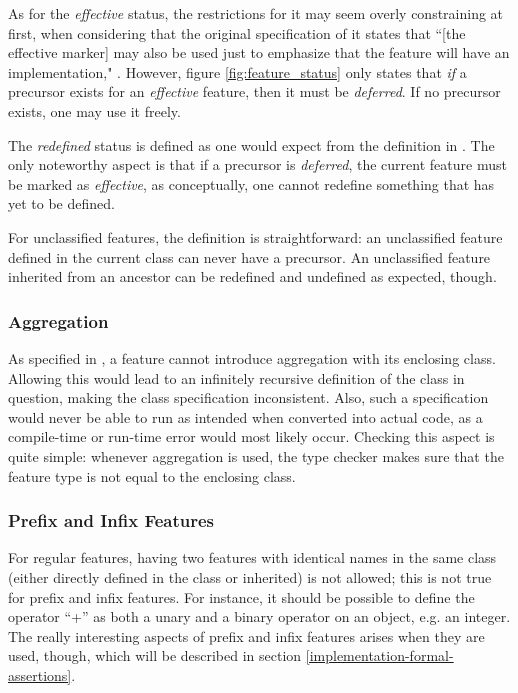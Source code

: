 As for the \textit{effective} status, the restrictions for it may seem overly constraining at first, when considering that the original specification of it states that ``[the effective marker] may also be used just to emphasize that the feature will have an implementation," \cite[p.~40]{walden1995}. However, figure \ref{fig:feature_status} only states that \emph{if} a precursor exists for an \textit{effective} feature, then it must be \textit{deferred}. If no precursor exists, one may use it freely.

The \textit{redefined} status is defined as one would expect from the definition in \cite[p.~40]{walden1995}. The only noteworthy aspect is that if a precursor is \textit{deferred}, the current feature must be marked as \textit{effective}, as conceptually, one cannot redefine something that has yet to be defined.

For unclassified features, the definition is straightforward: an unclassified feature defined in the current class can never have a precursor. An unclassified feature inherited from an ancestor can be redefined and undefined as expected, though.
\subsubsection{Aggregation}
As specified in \cite{ostroff2001}, a feature cannot introduce aggregation with its enclosing class. Allowing this would lead to an infinitely recursive definition of the class in question, making the class specification inconsistent. Also, such a specification would never be able to run as intended when converted into actual code, as a compile-time or run-time error would most likely occur. Checking this aspect is quite simple: whenever aggregation is used, the type checker makes sure that the feature type is not equal to the enclosing class.
\subsubsection{Prefix and Infix Features}
For regular features, having two features with identical names in the same class (either directly defined in the class or inherited) is not allowed; this is not true for prefix and infix features. For instance, it should be possible to define the operator ``+'' as both a unary and a binary operator on an object, e.g. an integer. The really interesting aspects of prefix and infix features arises when they are used, though, which will be described in section \ref{implementation-formal-assertions}.

